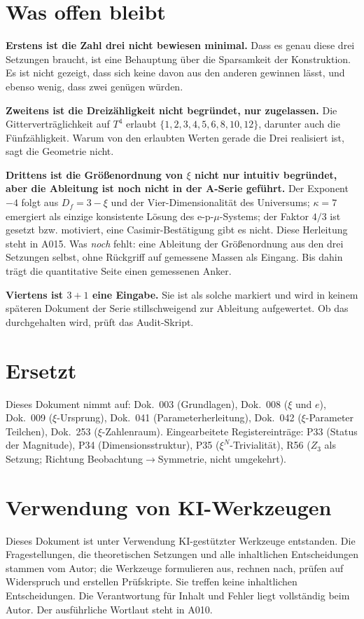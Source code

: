 \section{Was offen bleibt}

\textbf{Erstens ist die Zahl drei nicht bewiesen minimal.} Dass es genau diese
drei Setzungen braucht, ist eine Behauptung über die Sparsamkeit der
Konstruktion. Es ist nicht gezeigt, dass sich keine davon aus den anderen
gewinnen lässt, und ebenso wenig, dass zwei genügen würden.

\textbf{Zweitens ist die Dreizähligkeit nicht begründet, nur zugelassen.} Die
Gitterverträglichkeit auf $T^4$ erlaubt $\{1,2,3,4,5,6,8,10,12\}$, darunter auch
die Fünfzähligkeit. Warum von den erlaubten Werten gerade die Drei realisiert ist,
sagt die Geometrie nicht.

\textbf{Drittens ist die Größenordnung von $\xi$ nicht nur intuitiv begründet,
aber die Ableitung ist noch nicht in der A-Serie geführt.} Der Exponent $-4$
folgt aus $D_f=3-\xi$ und der Vier-Dimensionalität des Universums; $\kappa=7$
emergiert als einzige konsistente Lösung des e-p-$\mu$-Systems; der Faktor
$4/3$ ist gesetzt bzw. motiviert, eine Casimir-Bestätigung gibt es nicht. Diese Herleitung steht
in A015. Was \emph{noch} fehlt: eine Ableitung der Größenordnung aus den drei
Setzungen selbst, ohne Rückgriff auf gemessene Massen als Eingang. Bis dahin
trägt die quantitative Seite einen gemessenen Anker.

\textbf{Viertens ist $3+1$ eine Eingabe.} Sie ist als solche markiert und wird
in keinem späteren Dokument der Serie stillschweigend zur Ableitung
aufgewertet. Ob das durchgehalten wird, prüft das Audit-Skript.

\section{Ersetzt}

Dieses Dokument nimmt auf: Dok.~003 (Grundlagen), Dok.~008
($\xi$ und $e$), Dok.~009 ($\xi$-Ursprung), Dok.~041
(Parameterherleitung), Dok.~042 ($\xi$-Parameter Teilchen), Dok.~253
($\xi$-Zahlenraum). Eingearbeitete Registereinträge: P33 (Status der
Magnitude), P34 (Dimensionsstruktur), P35 ($\xi^N$-Trivialität), R56 ($Z_3$ als
Setzung; Richtung Beobachtung$\to$Symmetrie, nicht umgekehrt).

\section{Verwendung von KI-Werkzeugen}

Dieses Dokument ist unter Verwendung KI-gestützter Werkzeuge entstanden. Die
Fragestellungen, die theoretischen Setzungen und alle inhaltlichen
Entscheidungen stammen vom Autor; die Werkzeuge formulieren aus, rechnen nach,
prüfen auf Widerspruch und erstellen Prüfskripte. Sie treffen keine
inhaltlichen Entscheidungen. Die Verantwortung für Inhalt und Fehler liegt
vollständig beim Autor. Der ausführliche Wortlaut steht in A010.
